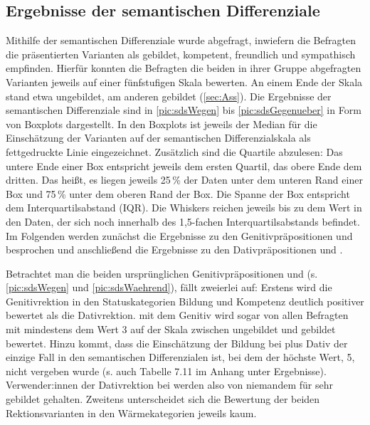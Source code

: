\subsection{Ergebnisse der semantischen Differenziale}
\label{sec:ErgSemDiff}
Mithilfe der semantischen Differenziale wurde abgefragt, inwiefern die Befragten die präsentierten Varianten als gebildet, kompetent, freundlich und sympathisch empfinden. 
Hierfür konnten die Befragten die beiden in ihrer Gruppe abgefragten Varianten jeweils auf einer fünfstufigen Skala bewerten. 
An einem Ende der Skala stand etwa \glqq ungebildet\grqq, am anderen \glqq gebildet\grqq{} (\autoref{sec:Ass}). 
Die Ergebnisse der semantischen Differenziale sind in \autoref{pic:sdsWegen} bis \autoref{pic:sdsGegenueber} in Form von Boxplots dargestellt.
In den Boxplots ist jeweils der Median für die Einschätzung der Varianten auf der semantischen Differenzialskala als fettgedruckte Linie eingezeichnet. 
Zusätzlich sind die Quartile abzulesen: Das untere Ende einer Box entspricht jeweils dem ersten Quartil, das obere Ende dem dritten. 
Das heißt, es liegen jeweils 25\,\% der Daten unter dem unteren Rand einer Box und 75\,\% unter dem oberen Rand der Box.
Die Spanne der Box entspricht dem Interquartilsabstand (IQR). 
Die Whiskers reichen jeweils bis zu dem Wert in den Daten, der sich noch innerhalb des 1,5-fachen Interquartilsabstands befindet.
Im Folgenden werden zunächst die Ergebnisse zu den Genitivpräpositionen \wegen{} und \waehrend{} besprochen und anschließend die Ergebnisse zu den Dativpräpositionen \dank{} und \gegenueber. 

Betrachtet man die beiden ursprünglichen Genitivpräpositionen \wegen{} und \waehrend{} (s. \autoref{pic:sdsWegen} und \autoref{pic:sdsWaehrend}), fällt zweierlei auf: 
Erstens wird die Genitivrektion in den Statuskategorien \glqq Bildung\grqq{} und \glqq Kompetenz\grqq{} deutlich positiver bewertet als die Dativrektion. 
 mit dem Genitiv wird sogar von allen Befragten mit mindestens dem Wert 3 auf der Skala zwischen ungebildet und gebildet bewertet. 
Hinzu kommt, dass die Einschätzung der Bildung bei \waehrend{} plus Dativ der einzige Fall in den semantischen Differenzialen ist, bei dem der höchste Wert, 5, nicht vergeben wurde (s. auch Tabelle 7.11 im Anhang unter Ergebnisse). 
Verwender:innen der Dativrektion bei \waehrend{} werden also von niemandem für sehr gebildet gehalten. 
Zweitens unterscheidet sich die Bewertung der beiden Rektionsvarianten in den Wärmekategorien jeweils kaum.

